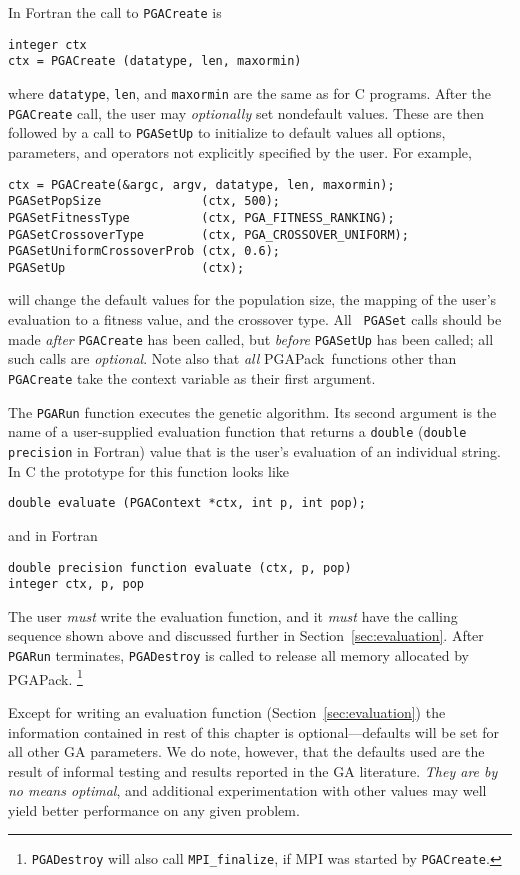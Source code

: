 \documentclass{report}
\newcommand{\pga}{PGAPack}
\begin{document}
In Fortran the call to {\tt PGACreate} is
\begin{verbatim}
integer ctx
ctx = PGACreate (datatype, len, maxormin)
\end{verbatim}
where  {\tt datatype}, {\tt len}, and {\tt maxormin} are the same as for C
programs.
After the {\tt PGACreate} call, the user may {\em optionally} set nondefault
values.  These are then followed by a call to {\tt PGASetUp} to initialize to
default values all options, parameters, and operators not explicitly specified
by the user. For example,
\begin{verbatim}
ctx = PGACreate(&argc, argv, datatype, len, maxormin);
PGASetPopSize              (ctx, 500);
PGASetFitnessType          (ctx, PGA_FITNESS_RANKING);
PGASetCrossoverType        (ctx, PGA_CROSSOVER_UNIFORM);
PGASetUniformCrossoverProb (ctx, 0.6);
PGASetUp                   (ctx);
\end{verbatim}
will change the default values for the population size, the mapping
of the user's
evaluation to a fitness value, and the crossover type.  All {\tt
PGASet} calls should be made {\em after} {\tt PGACreate} has been called, but
{\em before} {\tt PGASetUp} has been called; all such calls are {\em
optional}.  Note also that {\em all} \pga\ functions other than {\tt
PGACreate} take the context variable as their first argument.

The {\tt PGARun} function executes the genetic algorithm.  Its second argument
is the name of a user-supplied evaluation function that returns a {\tt double}
({\tt double precision} in Fortran) value that is the user's evaluation of an
individual string.  In C the prototype for this function looks like
\begin{verbatim}
double evaluate (PGAContext *ctx, int p, int pop);
\end{verbatim}
and in Fortran
\begin{verbatim}
double precision function evaluate (ctx, p, pop)
integer ctx, p, pop
\end{verbatim}
The user {\em must} write the evaluation function, and it {\em must} have the
calling sequence shown above and discussed further in
Section~\ref{sec:evaluation}.  After {\tt PGARun} terminates, {\tt PGADestroy}
is called to release all memory allocated by \pga.
\footnote{{\tt PGADestroy} will also call {\tt MPI\_finalize}, if MPI was
started by {\tt PGACreate}.}

Except for writing an evaluation function (Section~\ref{sec:evaluation}) the
information contained in rest of this chapter is optional---defaults will be
set for all other GA parameters.  We do note, however, that the defaults used
are the result of informal testing and results reported in the GA literature.
{\em They are by no means optimal}, and additional experimentation
with other values may well yield better performance on any given problem.
\end{document}
